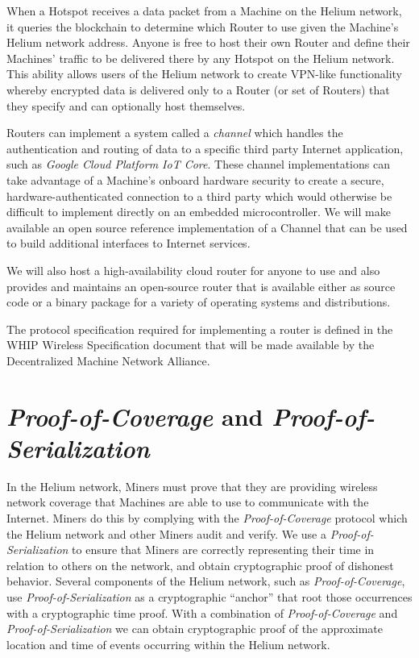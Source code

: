 \documentclass[10pt, nonatbib, nocopyrightspace, reprint]{sigplanconf}
\begin{document}
When a Hotspot receives a data packet from a Machine on the Helium network, it queries the blockchain to determine which Router to use given the Machine's Helium network address. Anyone is free to host their own Router and define their Machines' traffic to be delivered there by any Hotspot on the Helium network. This ability allows users of the Helium network to create VPN-like functionality whereby encrypted data is delivered only to a Router (or set of Routers) that they specify and can optionally host themselves.

Routers can implement a system called a \emph{channel} which handles the authentication and routing of data to a specific third party Internet application, such as \emph{Google Cloud Platform IoT Core}. These channel implementations can take advantage of a Machine's onboard hardware security to create a secure, hardware-authenticated connection to a third party which would otherwise be difficult to implement directly on an embedded microcontroller. We will make available an open source reference implementation of a Channel that can be used to build additional interfaces to Internet services.

We will also host a high-availability cloud router for anyone to use and also provides and maintains an open-source router that is available either as source code or a binary package for a variety of operating systems and distributions.

The protocol specification required for implementing a router is defined in the WHIP Wireless Specification document that will be made available by the Decentralized Machine Network Alliance.

\section{\emph{Proof-of-Coverage} and \emph{Proof-of-Serialization}}\label{poc}

In the Helium network, Miners must prove that they are providing wireless network coverage that Machines are able to use to communicate with the Internet. Miners do this by complying with the \emph{Proof-of-Coverage} protocol which the Helium network and other Miners audit and verify. We use a \emph{Proof-of-Serialization} to ensure that Miners are correctly representing their time in relation to others on the network, and obtain cryptographic proof of dishonest behavior. Several components of the Helium network, such as \emph{Proof-of-Coverage}, use \emph{Proof-of-Serialization} as a cryptographic ``anchor'' that root those occurrences  with a cryptographic time proof. With a combination of \emph{Proof-of-Coverage} and \emph{Proof-of-Serialization} we can obtain cryptographic proof of the approximate location and time of events occurring within the Helium network.
\end{document}
